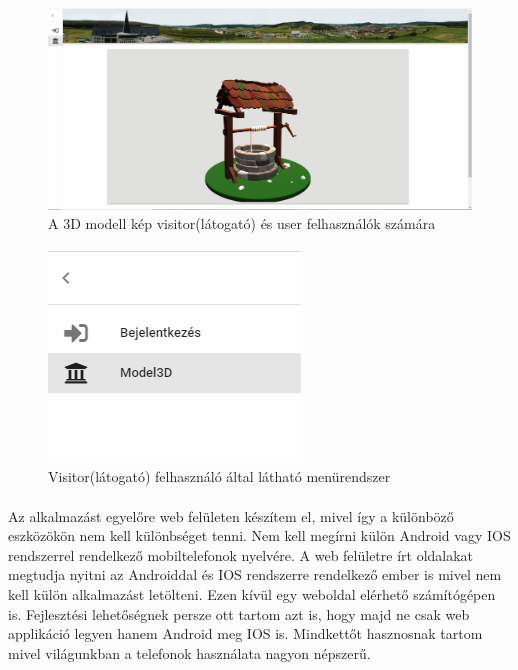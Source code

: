 	\begin{figure}
		\centering
		\includegraphics[scale=0.4]{figures/images/modell.png}
		\caption{A 3D modell kép visitor(látogató) és user felhasználók számára}
		\label{fig:modell}
	\end{figure}

	\begin{figure}
		\centering
		\includegraphics[scale=0.7]{figures/images/drawbarevery.png}
		\caption{Visitor(látogató) felhasználó által látható menürendszer}
		\label{fig:drawbarevery}
	\end{figure}
	
	\paragraph{}
	Az alkalmazást egyelőre web felületen készítem el, mivel így a különböző eszközökön nem kell különbséget tenni. Nem kell megírni külön Android vagy IOS rendszerrel rendelkező mobiltelefonok nyelvére. A web felületre írt oldalakat megtudja nyitni az Androiddal és IOS rendszerre rendelkező ember is mivel nem kell külön alkalmazást letölteni. Ezen kívül egy weboldal elérhető számítógépen is. Fejlesztési lehetőségnek persze ott tartom azt is, hogy majd ne csak web applikáció legyen hanem Android meg IOS is. Mindkettőt hasznosnak tartom mivel világunkban a telefonok használata nagyon népszerű.